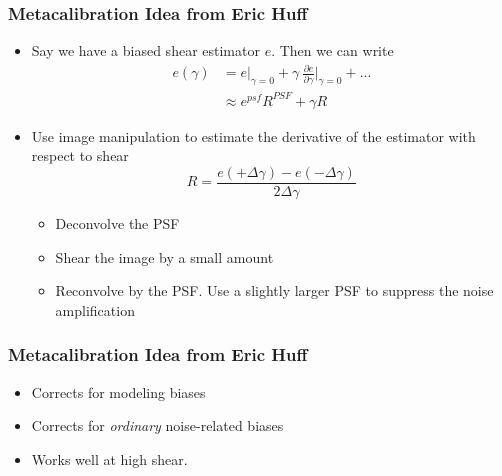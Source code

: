 \documentclass{beamer}
\newcommand{\mest}{e}
\begin{document}
\frame
{
    \frametitle{Metacalibration Idea from Eric Huff}

 
    \begin{itemize}

        \item Say we have a biased shear estimator {\color{gold} $e$}.  Then we can write
            {\color{gold}
                \begin{align} \label{eq:Eexpand}
                    \mest(\gamma) &= \mest|_{\gamma=0} + \gamma ~ \frac{ \partial \mest }{ \partial \gamma }\bigg|_{\gamma=0}  + ... \\
                                  &\approx e^{psf} R^{PSF} + \gamma R
                \end{align}
            } 
        \item Use image manipulation to estimate the derivative of the
            estimator with respect to shear
            {\color{gold}
                \begin{equation}
                    R = \frac{\mest(+\Delta\gamma) - \mest(-\Delta\gamma)}{2 \Delta \gamma} \nonumber 
                \end{equation}
            }
            \begin{itemize}
                \item Deconvolve the PSF
                \item Shear the image by a small amount
                \item Reconvolve by the PSF.  Use a slightly larger PSF to suppress
                    the noise amplification
            \end{itemize}


    \end{itemize}

}

\frame
{
    \frametitle{Metacalibration Idea from Eric Huff}

 
    \begin{itemize}
        
        \item Corrects for modeling biases

        \item Corrects for {\em ordinary} noise-related biases

        \item Works well at high shear.

    \end{itemize}

}
\end{document}
